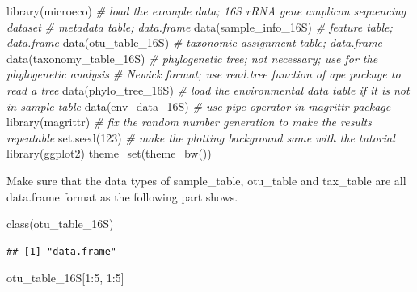 \documentclass[
]{book}
\newenvironment{Shaded}{\begin{snugshade}}{\end{snugshade}}
\newcommand{\CommentTok}[1]{\textcolor[rgb]{0.56,0.35,0.01}{\textit{#1}}}
\newcommand{\DecValTok}[1]{\textcolor[rgb]{0.00,0.00,0.81}{#1}}
\newcommand{\FunctionTok}[1]{\textcolor[rgb]{0.00,0.00,0.00}{#1}}
\newcommand{\NormalTok}[1]{#1}
\newcommand{\SpecialCharTok}[1]{\textcolor[rgb]{0.00,0.00,0.00}{#1}}
\begin{document}
\begin{Shaded}
\begin{Highlighting}[]
\FunctionTok{library}\NormalTok{(microeco)}
\CommentTok{\# load the example data; 16S rRNA gene amplicon sequencing dataset}
\CommentTok{\# metadata table; data.frame}
\FunctionTok{data}\NormalTok{(sample\_info\_16S)}
\CommentTok{\# feature table; data.frame}
\FunctionTok{data}\NormalTok{(otu\_table\_16S)}
\CommentTok{\# taxonomic assignment table; data.frame}
\FunctionTok{data}\NormalTok{(taxonomy\_table\_16S)}
\CommentTok{\# phylogenetic tree; not necessary; use for the phylogenetic analysis}
\CommentTok{\# Newick format; use read.tree function of ape package to read a tree}
\FunctionTok{data}\NormalTok{(phylo\_tree\_16S)}
\CommentTok{\# load the environmental data table if it is not in sample table}
\FunctionTok{data}\NormalTok{(env\_data\_16S)}
\CommentTok{\# use pipe operator in magrittr package}
\FunctionTok{library}\NormalTok{(magrittr)}
\CommentTok{\# fix the random number generation to make the results repeatable}
\FunctionTok{set.seed}\NormalTok{(}\DecValTok{123}\NormalTok{)}
\CommentTok{\# make the plotting background same with the tutorial}
\FunctionTok{library}\NormalTok{(ggplot2)}
\FunctionTok{theme\_set}\NormalTok{(}\FunctionTok{theme\_bw}\NormalTok{())}
\end{Highlighting}
\end{Shaded}

Make sure that the data types of sample\_table, otu\_table and tax\_table are all data.frame format as the following part shows.

\begin{Shaded}
\begin{Highlighting}[]
\FunctionTok{class}\NormalTok{(otu\_table\_16S)}
\end{Highlighting}
\end{Shaded}

\begin{verbatim}
## [1] "data.frame"
\end{verbatim}

\begin{Shaded}
\begin{Highlighting}[]
\NormalTok{otu\_table\_16S[}\DecValTok{1}\SpecialCharTok{:}\DecValTok{5}\NormalTok{, }\DecValTok{1}\SpecialCharTok{:}\DecValTok{5}\NormalTok{]}
\end{Highlighting}
\end{Shaded}
\end{document}
